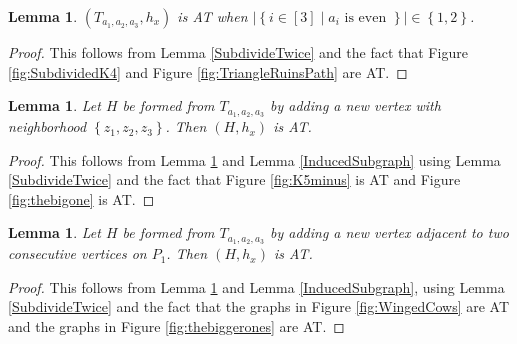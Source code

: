 \documentclass[12pt]{article}
\theoremstyle{plain}
\newtheorem{lem}[thm]{Lemma}
\theoremstyle{definition}
\theoremstyle{remark}
\newcommand{\set}[1]{\left\{ #1 \right\}}
\newcommand{\setb}[3]{\left\{ #1 \in #2 \mid #3 \right\}}
\newcommand{\card}[1]{\left|#1\right|}
\newcommand{\irange}[1]{\left[#1\right]}
\begin{document}
\begin{lem}\label{OneOrTwoEvenFromK3PathsIsAT}
	$(T_{a_1, a_2, a_3}, h_x)$ is AT when $\card{\setb{i}{\irange{3}}{a_i \text{ is even }}} \in \set{1,2}$.
\end{lem}
\begin{proof}
	This follows from Lemma \ref{SubdivideTwice} and the fact that Figure \ref{fig:SubdividedK4} and Figure \ref{fig:TriangleRuinsPath} are AT.
\end{proof}

\begin{lem}\label{OneOrTwoEvenFromK4PathsIsAT}
	Let $H$ be formed from $T_{a_1, a_2, a_3}$ by adding a new vertex with neighborhood $\set{z_1, z_2, z_3}$.  Then
	$(H, h_x)$ is AT.
\end{lem}
\begin{proof}
	This follows from Lemma \ref{OneOrTwoEvenFromK3PathsIsAT} and Lemma \ref{InducedSubgraph} using Lemma \ref{SubdivideTwice} and the fact that Figure \ref{fig:K5minus} is AT and Figure \ref{fig:thebigone} is AT.
\end{proof}

\begin{lem}\label{OneOrTwoEvenFromK3PathsWithK3HangerIsAT}
	Let $H$ be formed from $T_{a_1, a_2, a_3}$ by adding a new vertex adjacent to two consecutive vertices on $P_1$.  Then
	$(H, h_x)$ is AT.
\end{lem}
\begin{proof}
	This follows from Lemma \ref{OneOrTwoEvenFromK3PathsIsAT} and Lemma \ref{InducedSubgraph}, using Lemma \ref{SubdivideTwice} and the fact that the graphs in Figure \ref{fig:WingedCows} are AT and the graphs in Figure \ref{fig:thebiggerones} are AT.
\end{proof}
\end{document}
